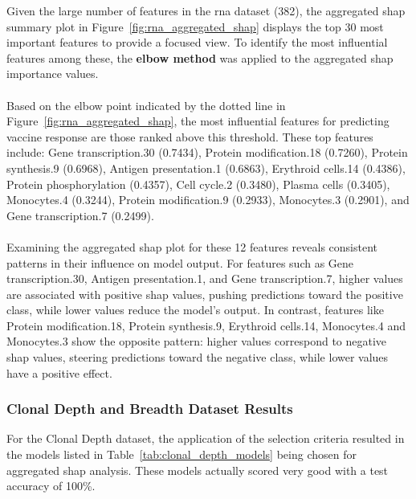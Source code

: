\documentclass[12pt,a4paper]{report}
\begin{document}
\noindent
Given the large number of features in the \acrshort{rna} dataset (382), the aggregated \gls{shap} summary plot in Figure~\ref{fig:rna_aggregated_shap} displays the top 30 most important features to provide a focused view. To identify the most influential features among these, the \textbf{elbow method} was applied to the aggregated \gls{shap} importance values.\\
\\
Based on the elbow point indicated by the dotted line in Figure~\ref{fig:rna_aggregated_shap}, the most influential features for predicting vaccine response are those ranked above this threshold. These top features include: Gene transcription.30 (0.7434), Protein modification.18 (0.7260), Protein synthesis.9 (0.6968), Antigen presentation.1 (0.6863), Erythroid cells.14 (0.4386), Protein phosphorylation (0.4357), Cell cycle.2 (0.3480), Plasma cells (0.3405), Monocytes.4 (0.3244), Protein modification.9 (0.2933), Monocytes.3 (0.2901), and Gene transcription.7 (0.2499).\\
\\
Examining the aggregated \gls{shap} plot for these 12 features reveals consistent patterns in their influence on model output. For features such as Gene transcription.30, Antigen presentation.1, and Gene transcription.7, higher values are associated with positive \gls{shap} values, pushing predictions toward the positive class, while lower values reduce the model's output. In contrast, features like Protein modification.18, Protein synthesis.9, Erythroid cells.14, Monocytes.4 and Monocytes.3 show the opposite pattern: higher values correspond to negative \gls{shap} values, steering predictions toward the negative class, while lower values have a positive effect.

\subsubsection*{Clonal Depth and Breadth Dataset Results}
For the Clonal Depth dataset, the application of the selection criteria resulted in the models listed in Table~\ref{tab:clonal_depth_models} being chosen for aggregated \gls{shap} analysis. These models actually scored very good with a test accuracy of 100\%.\\
\end{document}
